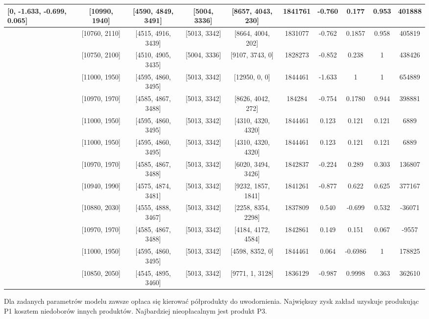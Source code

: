 \documentclass[a4paper,10pt,fleqn]{article}
\begin{document}
\begin{landscape}
\begin{center}
\begin{tabular}{ | l | c | c | c | c | c | c | c | c |c |}
				[0, -1.633, -0.699, 0.065] &  [10990, 1940] & [4590, 4849, 3491] & [5004, 3336] & [8657, 4043, 230] & 1841761 & -0.760  & 0.177  & 0.953  & 401888 \\  \hline
				 [1800000, -1.633, -0.699, 0.065] &  [10760, 2110] & [4515, 4916, 3439] & [5013, 3342] & [8664, 4004, 202] & 1831077 & -0.762  & 0.1857  & 0.958  & 405819 \\  \hline
				 [1800000, -2, -0.699, 0.065] &  [10750, 2100] & [4510, 4905, 3435] & [5004, 3336] & [9107, 3743, 0] & 1828273 & -0.852  & 0.238  & 1  & 438426 \\  \hline
				 [1800000, -3, -0.699, 0.065] &  [11000, 1950] & [4595, 4860, 3495] & [5013, 3342] & [12950, 0, 0] & 1844461 &  -1.633  & 1  & 1  & 654889 \\  \hline
				 [1500000, -1.633, -0.699, 0.065] &  [10970, 1970] & [4585, 4867, 3488] & [5013, 3342] & [8626, 4042, 272] & 184284 & -0.754  & 0.1780  & 0.944  & 398881 \\  \hline
				 [1500000, -1, -1, -1] &  [11000, 1950] & [4595, 4860, 3495] & [5013, 3342] & [4310, 4320, 4320] & 1844461 & 0.123  & 0.121  & 0.121  & 6889\\ \hline
				 [1800000, 0, 0, 0] &  [11000, 1950] & [4595, 4860, 3495] & [5013, 3342] & [4310, 4320, 4320] & 1844461 & 0.123  & 0.121  & 0.121  & 6889 \\ \hline
				 [1800000, 0, 0.5, 0.5] &  [10970, 1970] & [4585, 4867, 3488] & [5013, 3342] & [6020, 3494, 3426] & 1842837 & -0.224  & 0.289  & 0.303  & 136807 \\ \hline
				 [1000000, -1, 0.5, 0.5] &  [10940, 1990] & [4575, 4874, 3481] & [5013, 3342] & [9232, 1857, 1841] & 1841261 & -0.877  & 0.622  & 0.625  & 377167 \\ \hline
				 [1000000, 0.5, -1, 0.5] &  [10880, 2030] & [4555, 4888, 3467] & [5013, 3342] & [2258, 8354, 2298] & 1837809 & 0.540  & -0.699  & 0.532  & -36071 \\ \hline
				 [1000000, 0.5, 0.5, -1] &  [10970, 1970] & [4585, 4867, 3488] & [5013, 3342] & [4184, 4172, 4584] & 1842861 & 0.149  & 0.151  & 0.067  & -9557\\ \hline
				 [1000000, -1, -1, 1] &  [11000, 1950] & [4595, 4860, 3495] & [5013, 3342] & [4598, 8352, 0] & 1844461 & 0.064  & -0.6986  & 1  & 178825 \\ \hline
				 [1000000, -2, 0, -1] &  [10850, 2050] & [4545, 4895, 3460] & [5013, 3342] & [9771, 1, 3128] & 1836129 & -0.987  & 0.9998  & 0.363 & 362610 \\ \hline
				 
			    \end{tabular}
			\end{center}

			Dla zadanych parametrów modelu zawsze opłaca się kierować półprodukty do uwodornienia. Największy zysk zakład uzyskuje produkując P1 kosztem niedoborów innych produktów. Najbardziej nieopłacalnym jest produkt P3.

		\end{landscape}
\end{document}
